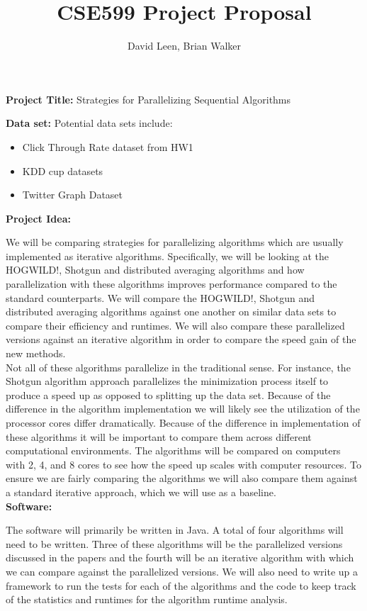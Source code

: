 \documentclass{article}
\title{CSE599 Project Proposal}
\author{David Leen, Brian Walker}
\begin{document}
\maketitle

\textbf{Project Title:}  Strategies for Parallelizing Sequential Algorithms

\textbf{Data set:} Potential data sets include: 
	\begin{itemize}
		\item Click Through Rate dataset from HW1
		\item KDD cup datasets
		\item Twitter Graph Dataset
	\end{itemize}
	
\textbf{Project Idea:}

	We will be comparing strategies for parallelizing algorithms which are usually implemented as iterative algorithms. Specifically, we will be looking at the HOGWILD!, Shotgun and distributed averaging algorithms and how parallelization with these algorithms improves performance compared to the standard counterparts. We will compare the HOGWILD!, Shotgun and distributed averaging algorithms against one another on similar data sets to compare their efficiency and runtimes.  We will also compare these parallelized versions against an iterative algorithm in order to compare the speed gain of the new methods.  \\
	
	Not all of these algorithms parallelize in the traditional sense.  For instance, the Shotgun algorithm approach parallelizes the minimization process itself to produce a speed up as opposed to splitting up the data set.  Because of the difference in the algorithm implementation we will likely see the utilization of the processor cores differ dramatically. Because of the difference in implementation of these algorithms it will be important to compare them across different computational environments. The algorithms will be compared on computers with 2, 4, and 8 cores to see how the speed up scales with computer resources.  To ensure we are fairly comparing the algorithms we will also compare them against a standard iterative approach, which we will use as a baseline. \\
	
\textbf{Software:}

	The software will primarily be written in Java.  A total of four algorithms will need to be written.  Three of these algorithms will be the parallelized versions discussed in the papers and the fourth will be an iterative algorithm with which we can compare against the parallelized versions.  We will also need to write up a framework to run the tests for each of the algorithms and the code to keep track of the statistics and runtimes for the algorithm runtime analysis. \\
\end{document}

